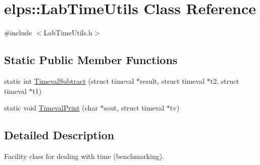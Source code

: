 \hypertarget{classelps_1_1_lab_time_utils}{\section{elps\+:\+:Lab\+Time\+Utils Class Reference}
\label{classelps_1_1_lab_time_utils}
}


{\ttfamily \#include $<$Lab\+Time\+Utils.\+h$>$}

\subsection*{Static Public Member Functions}
\begin{DoxyCompactItemize}
\item 
static int \hyperlink{classelps_1_1_lab_time_utils_a41c3ece69617f44128e2ec09f14ea8b4}{Timeval\+Subtract} (struct timeval $\ast$result, struct timeval $\ast$t2, struct timeval $\ast$t1)
\item 
static void \hyperlink{classelps_1_1_lab_time_utils_a5ac6a5eca9d8e1049fbd6837fa54350b}{Timeval\+Print} (char $\ast$sout, struct timeval $\ast$tv)
\end{DoxyCompactItemize}


\subsection{Detailed Description}
Facility class for dealing with time (benchmarking). 

